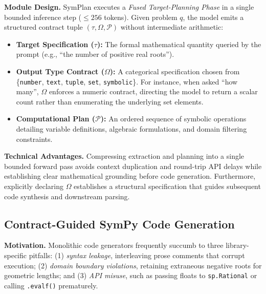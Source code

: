 \documentclass[runningheads]{llncs}
\begin{document}
\textbf{Module Design.} SymPlan executes a \textit{Fused Target-Planning Phase} in a single bounded inference step ($\le 256$ tokens). Given problem $q$, the model emits a structured contract tuple $(\tau, \Omega, \mathcal{P})$ without intermediate arithmetic:
\begin{itemize}
    \item \textbf{Target Specification ($\tau$):} The formal mathematical quantity queried by the prompt (e.g., ``the number of positive real roots'').
    \item \textbf{Output Type Contract ($\Omega$):} A categorical specification chosen from \{\texttt{number}, \texttt{text}, \texttt{tuple}, \texttt{set}, \texttt{symbolic}\}. For instance, when asked ``how many'', $\Omega$ enforces a numeric contract, directing the model to return a scalar count rather than enumerating the underlying set elements.
    \item \textbf{Computational Plan ($\mathcal{P}$):} An ordered sequence of symbolic operations detailing variable definitions, algebraic formulations, and domain filtering constraints.
\end{itemize}

\textbf{Technical Advantages.} Compressing extraction and planning into a single bounded forward pass avoids context duplication and round-trip API delays while establishing clear mathematical grounding before code generation. Furthermore, explicitly declaring $\Omega$ establishes a structural specification that guides subsequent code synthesis and downstream parsing.

\subsection{Contract-Guided SymPy Code Generation}
\label{sec:codegen}

\textbf{Motivation.} Monolithic code generators frequently succumb to three library-specific pitfalls: (1) \textit{syntax leakage}, interleaving prose comments that corrupt execution; (2) \textit{domain boundary violations}, retaining extraneous negative roots for geometric lengths; and (3) \textit{API misuse}, such as passing floats to \texttt{sp.Rational} or calling \texttt{.evalf()} prematurely.
\end{document}
